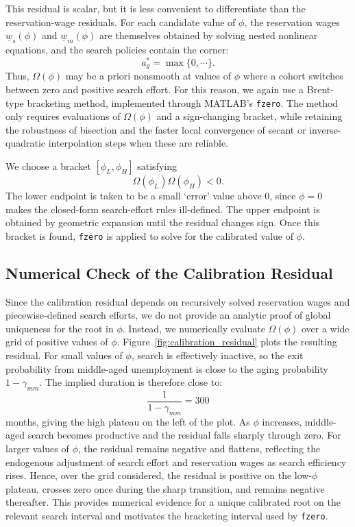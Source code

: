 \documentclass{article}
\begin{document}
This residual is scalar, but it is less convenient to differentiate than the reservation-wage residuals. For each candidate value of $\phi$, the reservation wages $\underline w_s(\phi)$ and $\underline w_m(\phi)$ are themselves obtained by solving nested nonlinear equations, and the search policies contain the corner:
\[
a_g^*=\max\{0,\cdots\}.
\]
Thus, $\Omega(\phi)$ may be a priori nonsmooth at values of $\phi$ where a cohort switches between zero and positive search effort. For this reason, we again use a Brent-type bracketing method, implemented through MATLAB's \texttt{fzero}. The method only requires evaluations of $\Omega(\phi)$ and a sign-changing bracket, while retaining the robustness of bisection and the faster local convergence of secant or inverse-quadratic interpolation steps when these are reliable.

We choose a bracket $[\phi_L,\phi_H]$ satisfying
\[
\Omega(\phi_L)\Omega(\phi_H)<0.
\]
The lower endpoint is taken to be a small `error' value above $0$, since $\phi=0$ makes the closed-form search-effort rules ill-defined. The upper endpoint is obtained by geometric expansion until the residual changes sign. Once this bracket is found, \texttt{fzero} is applied to solve for the calibrated value of $\phi$.

\subsection{Numerical Check of the Calibration Residual}
\label{app:calibration_residual_check}

Since the calibration residual depends on recursively solved reservation wages and piecewise-defined search efforts, we do not provide an analytic proof of global uniqueness for the root in $\phi$. Instead, we numerically evaluate $\Omega(\phi)$ over a wide grid of positive values of $\phi$. Figure~\ref{fig:calibration_residual} plots the resulting residual. For small values of $\phi$, search is effectively inactive, so the exit probability from middle-aged unemployment is close to the aging probability $1-\gamma_{mm}$. The implied duration is therefore close to:
\[
\frac{1}{1-\gamma_{mm}}=300
\]
months, giving the high plateau on the left of the plot. As $\phi$ increases, middle-aged search becomes productive and the residual falls sharply through zero. For larger values of $\phi$, the residual remains negative and flattens, reflecting the endogenous adjustment of search effort and reservation wages as search efficiency rises. Hence, over the grid considered, the residual is positive on the low-$\phi$ plateau, crosses zero once during the sharp transition, and remains negative thereafter. This provides numerical evidence for a unique calibrated root on the relevant search interval and motivates the bracketing interval used by \texttt{fzero}.
\end{document}
